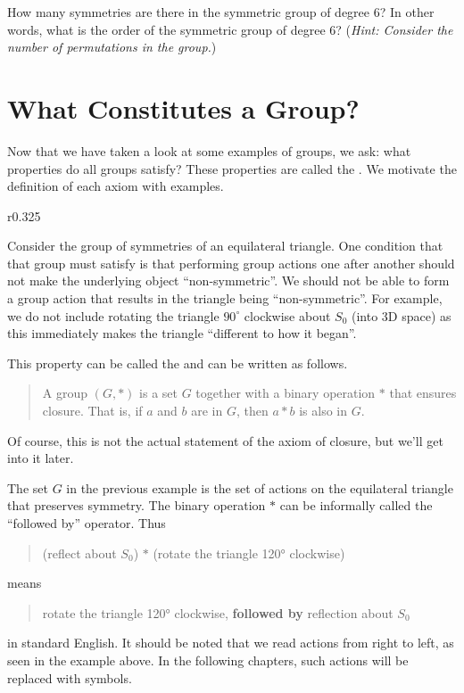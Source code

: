 \begin{exercise}
    How many symmetries are there in the symmetric group of degree 6? In other words, what is the order of the symmetric group of degree 6?\newline
    (\textit{Hint: Consider the number of permutations in the group.})
\end{exercise}

\section{What Constitutes a Group?}
Now that we have taken a look at some examples of groups, we ask: what properties do all groups satisfy? These properties are called the . We motivate the definition of each axiom with examples.

\begin{wrapfigure}{r}{0.325\textwidth}
    \centering
\end{wrapfigure}

Consider the group of symmetries of an equilateral triangle. One condition that that group must satisfy is that performing group actions one after another should not make the underlying object ``non-symmetric''. We should not be able to form a group action that results in the triangle being ``non-symmetric''. For example, we do not include rotating the triangle $90^\circ$ clockwise about $S_0$ (into 3D space) as this immediately makes the triangle ``different to how it began''.

\newpage

This property can be called the  and can be written as follows.
\begin{quote}
    A group $(G, \ast)$ is a set $G$ together with a binary operation $\ast$ that ensures closure. That is, if $a$ and $b$ are in $G$, then $a \ast b$ is also in $G$.
\end{quote}
Of course, this is not the actual statement of the axiom of closure, but we'll get into it later.

The set $G$ in the previous example is the set of actions on the equilateral triangle that preserves symmetry. The binary operation $\ast$ can be informally called the ``followed by'' operator. Thus
\begin{quote}
    (reflect about $S_0$) $\ast$ (rotate the triangle 120° clockwise)
\end{quote}
means
\begin{quote}
    rotate the triangle 120° clockwise, \textbf{followed by} reflection about $S_0$
\end{quote}
in standard English. It should be noted that we read actions from right to left, as seen in the example above. In the following chapters, such actions will be replaced with symbols.

